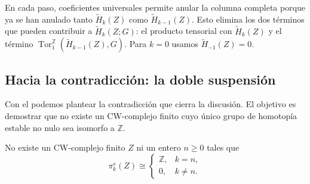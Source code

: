 \begin{nota}
En cada paso, coeficientes universales permite anular la columna completa porque ya se han anulado tanto $\tilde H_k(Z)$ como $\tilde H_{k-1}(Z)$. Esto elimina los dos términos que pueden contribuir a $\tilde H_k(Z;G)$: el producto tensorial con $\tilde H_k(Z)$ y el término $\operatorname{Tor}_1^{\mathbb Z}(\tilde H_{k-1}(Z),G)$. Para $k=0$ usamos $\tilde H_{-1}(Z)=0$.
\end{nota}

\subsection{Hacia la contradicción: la doble suspensión}

Con el  podemos plantear la contradicción que cierra la discusión. El objetivo es demostrar que no existe un CW-complejo finito cuyo único grupo de homotopía estable no nulo sea isomorfo a $\mathbb Z$.

\begin{prop}\label{prop:no-existe}
No existe un CW-complejo finito $Z$ ni un entero $n\ge0$ tales que
\[
\pi_k^s(Z)\cong
\begin{cases}
\mathbb Z, & k=n,\\
0, & k\neq n .
\end{cases}
\]
\end{prop}

